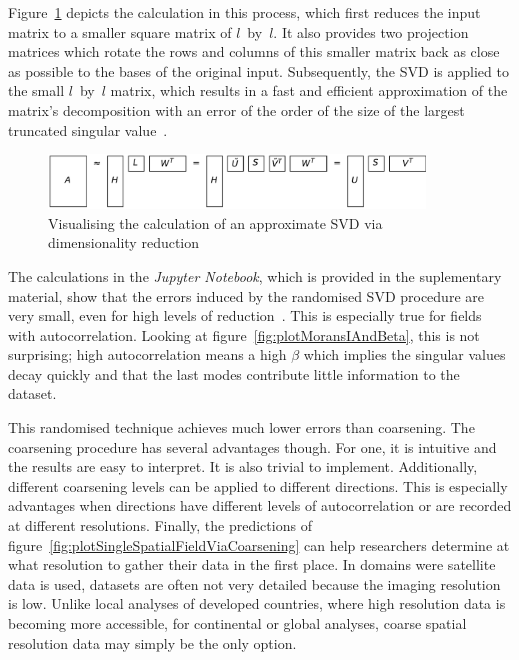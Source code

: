 \documentclass[ijgi,article,submit,moreauthors,pdftex,10pt,a4paper]{Definitions/mdpi}
\begin{document}
Figure~\ref{fig:reduceSizeRandomisedSquare} depicts the calculation in this process, which first reduces the input matrix to a smaller square matrix of $l$~by~$l$. It also provides two projection matrices which rotate the rows and columns of this smaller matrix back as close as possible to the bases of the original input. Subsequently, the SVD is applied to the small $l$~by~$l$ matrix, which results in a fast and efficient approximation of the matrix's decomposition with an error of the order of the size of the largest truncated singular value~\cite{Martinsson2016, Halko2011}.

\begin{figure}[H]
\centering
\includegraphics[width=100mm]{Results/reduceSizeRandomisedSquare.pdf}
\caption[Approximate randomised SVD]{Visualising the calculation of an approximate SVD via dimensionality reduction}
\label{fig:reduceSizeRandomisedSquare}
\end{figure}

The calculations in the \textit{Jupyter Notebook}, which is provided in the suplementary material, show that the errors induced by the randomised SVD procedure are very small, even for high levels of reduction~\cite{Bogaardt2018}. This is especially true for fields with autocorrelation. Looking at figure~\ref{fig:plotMoransIAndBeta}, this is not surprising; high autocorrelation means a high $\beta$ which implies the singular values decay quickly and that the last modes contribute little information to the dataset.

This randomised technique achieves much lower errors than coarsening. The coarsening procedure has several advantages though. For one, it is intuitive and the results are easy to interpret. It is also trivial to implement. Additionally, different coarsening levels can be applied to different directions. This is especially advantages when directions have different levels of autocorrelation or are recorded at different resolutions. Finally, the predictions of figure~\ref{fig:plotSingleSpatialFieldViaCoarsening} can help researchers determine at what resolution to gather their data in the first place. In domains were satellite data is used, datasets are often not very detailed because the imaging resolution is low. Unlike local analyses of developed countries, where high resolution data is becoming more accessible, for continental or global analyses, coarse spatial resolution data may simply be the only option.
\end{document}
